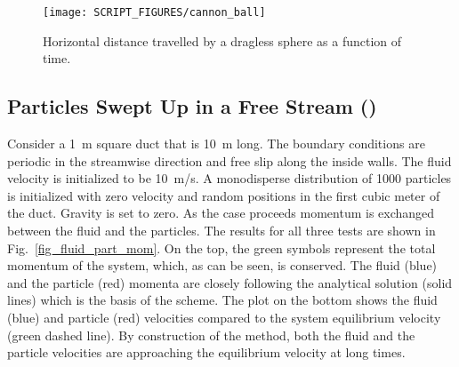 \documentclass[11pt]{book}
\begin{document}
\begin{figure}[!ht]
\centering
\texttt{[image: SCRIPT\_FIGURES/cannon\_ball]}
\caption[The {\ct cannon\_ball} case]{Horizontal distance travelled by a dragless sphere as a function of time.}
\label{cannon_ball_fig}
\end{figure}


\subsection{Particles Swept Up in a Free Stream (\texorpdfstring{}{fluid\_part\_mom})}

Consider a 1~m square duct that is 10~m long.  The boundary conditions are periodic in the streamwise direction and free slip along the inside walls. The fluid velocity is initialized to be 10~m/s. A monodisperse distribution of 1000 particles is initialized with zero velocity and random positions in the first cubic meter of the duct. Gravity is set to zero. As the case proceeds momentum is exchanged between the fluid and the particles. The results for all three tests are shown in Fig.~\ref{fig_fluid_part_mom}.  On the top, the green symbols represent the total momentum of the system, which, as can be seen, is conserved.  The fluid (blue) and the particle (red) momenta are closely following the analytical solution (solid lines) which is the basis of the scheme.  The plot on the bottom shows the fluid (blue) and particle (red) velocities compared to the system equilibrium velocity (green dashed line).  By construction of the method, both the fluid and the particle velocities are approaching the equilibrium velocity at long times.
\end{document}
